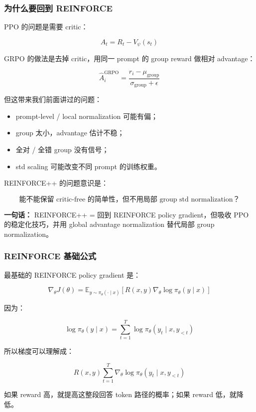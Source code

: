 \subsubsection{为什么要回到 REINFORCE}

PPO 的问题是需要 critic：

\[
A_t = R_t - V_\psi(s_t)
\]

GRPO 的做法是去掉 critic，用同一 prompt 的 group reward 做相对 advantage：

\[
\hat{A}_i^\text{GRPO}
=
\frac{r_i-\mu_\text{group}}{\sigma_\text{group}+\epsilon}
\]

但这带来我们前面讲过的问题：

\begin{itemize}[leftmargin=1.5em]
  \item prompt-level / local normalization 可能有偏；
  \item group 太小，advantage 估计不稳；
  \item 全对 / 全错 group 没有信号；
  \item std scaling 可能改变不同 prompt 的训练权重。
\end{itemize}

REINFORCE++ 的问题意识是：

\[
\text{能不能保留 critic-free 的简单性，但不用局部 group std normalization？}
\]

\begin{summarybox}
\textbf{一句话：} REINFORCE++ = 回到 REINFORCE policy gradient，但吸收 PPO 的稳定化技巧，并用 global advantage normalization 替代局部 group normalization。
\end{summarybox}

\subsubsection{REINFORCE 基础公式}

最基础的 REINFORCE policy gradient 是：

\[
\nabla_\theta J(\theta)
=
\mathbb{E}_{y\sim\pi_\theta(\cdot\mid x)}
\left[
R(x,y)
\nabla_\theta
\log \pi_\theta(y\mid x)
\right]
\]

因为：

\[
\log \pi_\theta(y\mid x)
=
\sum_{t=1}^{T}
\log \pi_\theta(y_t\mid x,y_{<t})
\]

所以梯度可以理解成：

\[
R(x,y)
\sum_{t=1}^{T}
\nabla_\theta
\log \pi_\theta(y_t\mid x,y_{<t})
\]

如果 reward 高，就提高这整段回答 token 路径的概率；如果 reward 低，就降低。

